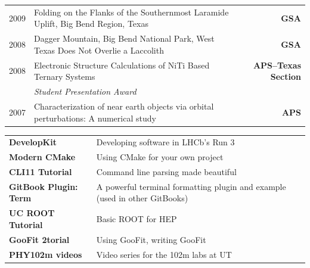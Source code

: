 \documentclass[10pt,letterpaper,english]{moderncv}
\begin{document}
\begin{tabularx}{\textwidth}{p{.35in}X>{\bfseries}r}
      2009 & Folding on the Flanks of the Southernmost Laramide Uplift, Big Bend Region, Texas & GSA \\[1em]

      2008 & Dagger Mountain, Big Bend National Park, West Texas Does Not Overlie a Laccolith & GSA \\[1em]

     2008 & Electronic Structure Calculations of NiTi Based Ternary Systems  & APS--Texas Section \\
     & \emph{Student Presentation Award} & \\

     2007 & Characterization of near earth objects via orbital perturbations: A numerical study & APS \\

\end{tabularx}








\begin{tabularx}{\textwidth}{>{\bfseries}p{1.45in}X}
DevelopKit & Developing software in LHCb's Run 3 \\
Modern CMake & Using CMake for your own project \\
CLI11 Tutorial & Command line parsing made beautiful \\
GitBook Plugin: Term & A powerful terminal formatting plugin and example (used in other GitBooks) \\
UC ROOT Tutorial & Basic ROOT for HEP \\
GooFit 2torial & Using GooFit, writing GooFit \\
PHY102m videos & Video series for the 102m labs at UT \\
\end{tabularx}
\end{document}
